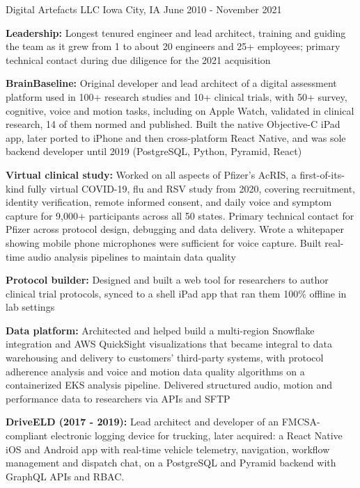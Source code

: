 \documentclass{resume}
\begin{document}
            {Digital Artefacts LLC}
            {Iowa City, IA}
            {June 2010 - November 2021}
\begin{resumeItems}
\item \textbf{Leadership:} Longest tenured engineer and lead architect, training and guiding the team as it grew from 1 to about 20 engineers and 25+ employees; primary technical contact during due diligence for the 2021 acquisition
\item \textbf{BrainBaseline:} Original developer and lead architect of a digital assessment platform used in 100+ research studies and 10+ clinical trials, with 50+ survey, cognitive, voice and motion tasks, including on Apple Watch, validated in clinical research, 14 of them normed and published.
Built the native Objective-C iPad app, later ported to iPhone and then cross-platform React Native, and was sole backend developer until 2019 (PostgreSQL, Python, Pyramid, React)
\item \textbf{Virtual clinical study:} Worked on all aspects of Pfizer's AcRIS, a first-of-its-kind fully virtual COVID-19, flu and RSV study from 2020, covering recruitment, identity verification, remote informed consent, and daily voice and symptom capture for 9,000+ participants across all 50 states.
Primary technical contact for Pfizer across protocol design, debugging and data delivery.
Wrote a whitepaper showing mobile phone microphones were sufficient for voice capture.
Built real-time audio analysis pipelines to maintain data quality
\item \textbf{Protocol builder:} Designed and built a web tool for researchers to author clinical trial protocols, synced to a shell iPad app that ran them 100\% offline in lab settings
\item \textbf{Data platform:} Architected and helped build a multi-region Snowflake integration and AWS QuickSight visualizations that became integral to data warehousing and delivery to customers' third-party systems, with protocol adherence analysis and voice and motion data quality algorithms on a containerized EKS analysis pipeline.
Delivered structured audio, motion and performance data to researchers via APIs and SFTP
\item \textbf{DriveELD (2017 - 2019):} Lead architect and developer of an FMCSA-compliant electronic logging device for trucking, later acquired: a React Native iOS and Android app with real-time vehicle telemetry, navigation, workflow management and dispatch chat, on a PostgreSQL and Pyramid backend with GraphQL APIs and RBAC.

\end{resumeItems}
\end{document}

